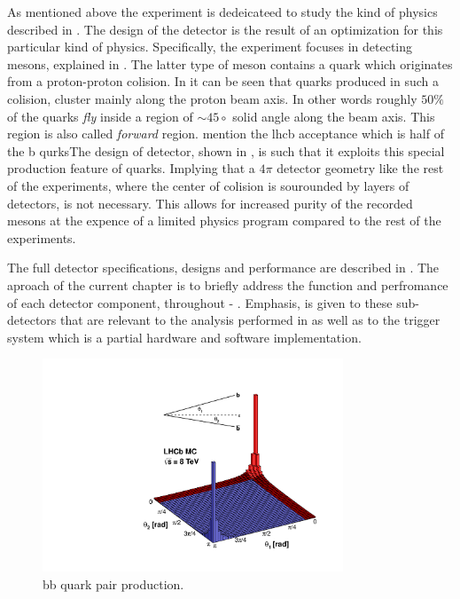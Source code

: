 As mentioned above the \lhcb experiment is dedeicateed to study the kind of physics described in \secref{}.
The design of the \lhcb detector is the result of an optimization for this particular kind of physics.
Specifically, the experiment focuses in detecting \B mesons, explained in \secref{}. The latter type of
meson contains a \bquark quark which originates from a proton-proton colision. In \figref{} it can be seen
that \bquark quarks produced in such a colision, cluster mainly along the proton beam axis. In other words
roughly $50\%$ of the \bquark quarks {\it fly} inside a region of $\sim 45\circ$ solid angle along the beam axis.
This region is also called {\it forward} region. {\color{red} mention the lhcb acceptance  which is half of the b qurks}The design of \lhcb detector, shown in \figref{}, is such that
it exploits this special production feature of \bquark quarks. Implying that a $4\pi$ detector geometry like the
rest of the \lhc experiments, where the center of colision is sourounded by layers of detectors, is not necessary.
This allows for increased purity of the recorded \B mesons at the expence of a limited physics program compared
to the rest of the \lhcb experiments.

The full \lhcb detector specifications, designs and performance are described in \cite{jnst}.
The aproach of the current chapter is to briefly address the function and perfromance of each detector component,
throughout  - . Emphasis, is given to these sub-detectors that are relevant
to the analysis performed in  as well as to the trigger system which is a partial hardware
and software implementation.

\begin{figure}[t]
  \centering
  \includegraphics[width=0.8\textwidth, trim=0cm 0cm 0cm 2.5cm, clip=true]{Figures/Chapter2/08_rad_acc_scheme_right}
  \caption{bb quark pair production.}
  \label{bb_roduction_angles}
\end{figure}
